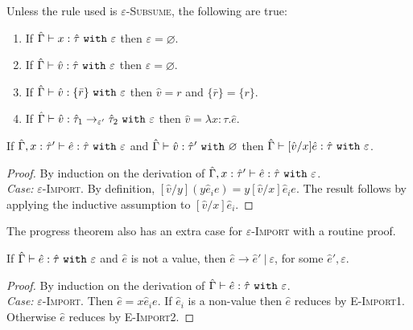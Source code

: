 \begin{lemma}
Unless the rule used is \textsc{$\varepsilon$-Subsume}, the following are true:
\begin{enumerate}
	\setlength\itemsep{-0.7em}
	\item If $\hat \Gamma \vdash x: \hat \tau~\mathtt{with}~ \varepsilon$ then $\varepsilon = \varnothing$.
	\item If $\hat \Gamma \vdash \hat v: \hat \tau~\mathtt{with}~ \varepsilon$ then $\varepsilon = \varnothing$.
	\item If $\hat \Gamma \vdash \hat v: \{ \bar r \}~\mathtt{with}~ \varepsilon$ then $\hat v = r$ and $\{ \bar r \} = \{ r \}$.
	\item If $\hat \Gamma \vdash \hat v: \hat \tau_1 \rightarrow_{\varepsilon'} \hat \tau_2~\mathtt{with}~ \varepsilon$ then $\hat v = \lambda x:\tau. \hat e$.
\end{enumerate}
\end{lemma}

\begin{lemma}
If $\hat \Gamma, x: \hat \tau' \vdash \hat e: \hat \tau~\mathtt{with}~ \varepsilon$ and $\hat \Gamma \vdash \hat v: \hat \tau'~\mathtt{with}~ \varnothing$ then $\hat \Gamma \vdash [\hat v/x]\hat e: \hat \tau~\mathtt{with}~ \varepsilon$.
\end{lemma}

\begin{proof} By induction on the derivation of $\hat \Gamma, x: \hat \tau' \vdash \hat e: \hat \tau~\mathtt{with}~ \varepsilon$.\\

\textit{Case:} \textsc{$\varepsilon$-Import}. By definition, $[\hat v/y]({y}{\hat e_i}{e}) = {y}{[\hat v/x] \hat e_i}{e}$. The result follows by applying the inductive assumption to $[\hat v/x] \hat e_i$.
\end{proof}

The progress theorem also has an extra case for \textsc{$\varepsilon$-Import} with a routine proof. 

\begin{theorem}
If $\hat \Gamma \vdash \hat e: \hat \tau~\mathtt{with}~ \varepsilon$ and $\hat e$ is not a value, then $\hat e \longrightarrow \hat e'~|~\varepsilon$, for some $\hat e', \varepsilon$.
\end{theorem}

\begin{proof} By induction on the derivation of $\hat \Gamma \vdash \hat e: \hat \tau~\mathtt{with}~ \varepsilon$.\\

\textit{Case:} \textsc{$\varepsilon$-Import}. Then $\hat e = {x}{\hat e_i}{e}$. If $\hat e_i$ is a non-value then $\hat e$ reduces by \textsc{E-Import1}. Otherwise $\hat e$ reduces by \textsc{E-Import2}.
\end{proof}

